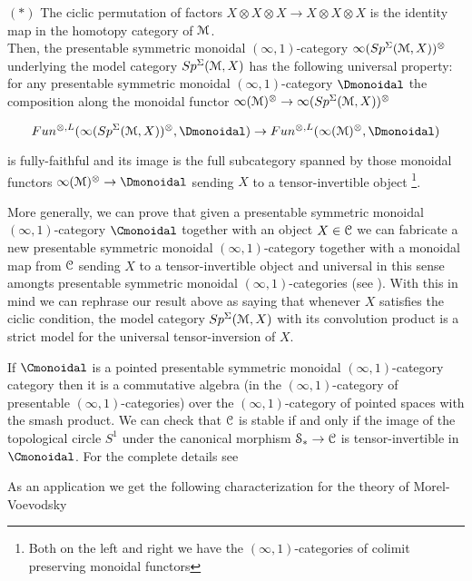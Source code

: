 \begin{refsection}
\begin{thm}
$(*)$ The ciclic permutation of factors $X\otimes X\otimes X\to X\otimes X\otimes X$ is the identity map in the homotopy category of $\mathcal{M}$.\\

Then, the presentable symmetric monoidal $(\infty,1)$-category $\infty(Sp^{\Sigma}(\mathcal{M}, X))^{\otimes}$ underlying the model category $Sp^{\Sigma}(\mathcal{M}, X)$ has the following universal property: for any presentable symmetric monoidal $(\infty,1)$-category $\Dmonoidal$ the composition along the monoidal functor $\infty(\mathcal{M})^{\otimes}\to\infty(Sp^{\Sigma}(\mathcal{M}, X))^{\otimes}$ 

$$Fun^{\otimes, L}(\infty(Sp^{\Sigma}(\M, X))^{\otimes} , \Dmonoidal)\to Fun^{\otimes, L}(\infty(\M)^{\otimes}, \Dmonoidal)$$

\noindent is fully-faithful and its image is the full subcategory spanned by those monoidal functors $\infty(\M)^{\otimes}\to \Dmonoidal$ sending $X$ to a tensor-invertible object \footnote{Both on the left and right we have the $(\infty,1)$-categories of colimit preserving monoidal functors}.
\end{thm}

More generally, we can prove that given a presentable symmetric monoidal $(\infty,1)$-category $\Cmonoidal$ together with an object $X\in \mathcal{C}$ we can fabricate a new presentable symmetric monoidal $(\infty,1)$-category together with a monoidal map from $\mathcal{C}$ sending $X$ to a tensor-invertible object and universal in this sense amongts presentable symmetric monoidal $(\infty,1)$-categories (see \cite[4.10]{nc1}). With this in mind we can rephrase our result above as saying that whenever $X$ satisfies the ciclic condition, the model category $Sp^{\Sigma}(\mathcal{M}, X)$ with its convolution product is a strict model for the universal tensor-inversion of $X$.\\


\begin{example}
If $\Cmonoidal$ is a pointed presentable symmetric monoidal $(\infty,1)$-category category then it is a commutative algebra  (in the $(\infty,1)$-category of presentable $(\infty,1)$-categories) over the $(\infty,1)$-category of pointed spaces with the smash product. We can check that $\mathcal{C}$ is stable if and only if the image of the topological circle $S^1$ under the canonical morphism $\mathcal{S}_{\ast}\to \mathcal{C}$ is tensor-invertible in $\Cmonoidal$. For the complete details see \cite[4.28]{nc1}
\end{example}

As an application we get the following characterization for the theory of Morel-Voevodsky


\end{refsection}
